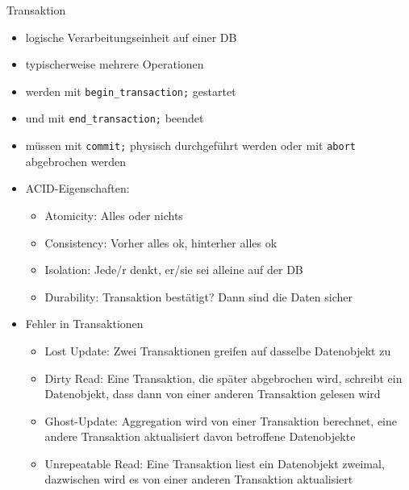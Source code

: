 \documentclass{article}
\begin{document}
\begin{block}{Transaktion}
  \begin{itemize}
    \item logische Verarbeitungseinheit auf einer DB
    \item typischerweise mehrere Operationen
    \item werden mit \texttt{begin\_transaction;} gestartet
    \item und mit \texttt{end\_transaction;} beendet
    \item müssen mit \texttt{commit;} physisch durchgeführt werden oder mit \texttt{abort} abgebrochen werden
    \item ACID-Eigenschaften:
    \begin{itemize}
      \item Atomicity: Alles oder nichts
      \item Consistency: Vorher alles ok, hinterher alles ok
      \item Isolation: Jede/r denkt, er/sie sei alleine auf der DB
      \item Durability: Transaktion bestätigt? Dann sind die Daten sicher
    \end{itemize}
    \item Fehler in Transaktionen
    \begin{itemize}
      \item Lost Update: Zwei Transaktionen greifen auf dasselbe Datenobjekt zu
      \item Dirty Read: Eine Transaktion, die später abgebrochen wird, schreibt ein Datenobjekt, dass dann von einer anderen Transaktion gelesen wird
      \item Ghost-Update: Aggregation wird von einer Transaktion berechnet, eine andere Transaktion aktualisiert davon betroffene Datenobjekte
      \item Unrepeatable Read: Eine Transaktion liest ein Datenobjekt zweimal, dazwischen wird es von einer anderen Transaktion aktualisiert
    \end{itemize}
  \end{itemize}
\end{block}
\end{document}
